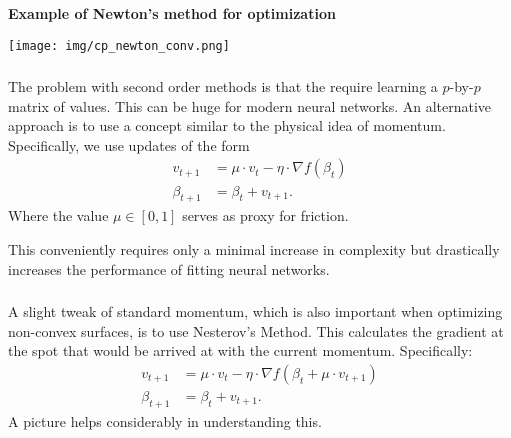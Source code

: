 \documentclass[xetex,mathserif,serif,aspectratio=169]{beamer}
\begin{document}
\begin{frame}[fragile] \frametitle{} \oldB \small

\textbf{Example of Newton's method for optimization}

\begin{center}
\texttt{[image: img/cp\_newton\_conv.png]}
\end{center}

\end{frame}

\begin{frame}[fragile] \frametitle{} \oldB \small

\textbf{}

The problem with second order methods is that the require learning
a $p$-by-$p$ matrix of values. This can be huge for modern neural
networks. An alternative approach is to use a concept similar to
the physical idea of momentum. Specifically, we use updates of
the form
\begin{align*}
v_{t+1} &= \mu \cdot v_{t} - \eta \cdot \nabla f(\beta_{t}) \\
\beta_{t+1} &= \beta_{t} + v_{t+1}.
\end{align*}
Where the value $\mu \in [0,1]$ serves as proxy for friction.

This conveniently requires only a minimal increase in complexity
but drastically increases the performance of fitting neural networks.

\end{frame}


\begin{frame}[fragile] \frametitle{} \oldB \small

\textbf{}

A slight tweak of standard momentum, which is also important
when optimizing non-convex surfaces, is to use Nesterov's Method.
This calculates the gradient at the spot that would be arrived
at with the current momentum. Specifically:
\begin{align*}
v_{t+1} &= \mu \cdot v_{t} - \eta \cdot \nabla f(\beta_t + \mu \cdot v_{t+1}) \\
\beta_{t+1} &= \beta_{t} + v_{t+1}.
\end{align*}
A picture helps considerably in understanding this.

\end{frame}
\end{document}
